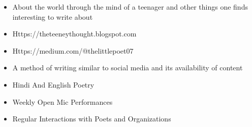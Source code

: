 \documentclass[10pt,a4paper]{altacv}
\begin{document}
\divider

\begin{itemize}
    \item About the world through the mind of a teenager and other things one finds interesting to write about
    \item Https://theteeneythought.blogspot.com
    \item Https://medium.com/@thelittlepoet07
\end{itemize}

\divider

\begin{itemize}
    \item A method of writing similar to social media and its availability of content
\end{itemize}

\divider

\begin{itemize}
    \item Hindi And English Poetry
    \item Weekly Open Mic Performances
    \item Regular Interactions with Poets and Organizations
\end{itemize}




\end{document}
